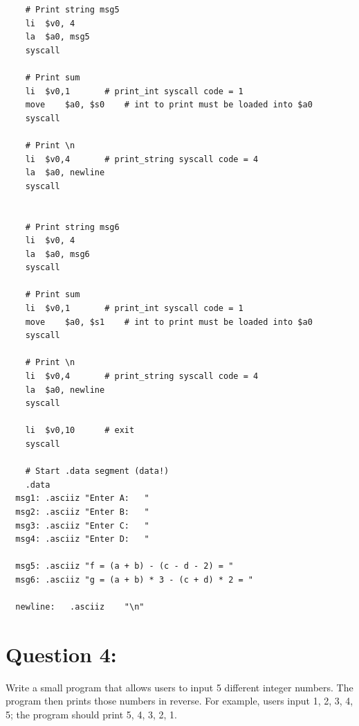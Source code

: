 \documentclass[12pt,a4paper]{article}
\begin{document}
\begin{mdframed}[hidealllines=true,backgroundcolor=magenta!10]
\begin{lstlisting}
    # Print string msg5
    li	$v0, 4
    la	$a0, msg5
    syscall

    # Print sum
    li	$v0,1		# print_int syscall code = 1
    move	$a0, $s0	# int to print must be loaded into $a0
    syscall

    # Print \n
    li	$v0,4		# print_string syscall code = 4
    la	$a0, newline
    syscall


    # Print string msg6
    li	$v0, 4
    la	$a0, msg6
    syscall

    # Print sum
    li	$v0,1		# print_int syscall code = 1
    move	$a0, $s1	# int to print must be loaded into $a0
    syscall

    # Print \n
    li	$v0,4		# print_string syscall code = 4
    la	$a0, newline
    syscall

    li	$v0,10		# exit
    syscall

    # Start .data segment (data!)
    .data
  msg1:	.asciiz	"Enter A:   "
  msg2:	.asciiz	"Enter B:   "
  msg3:	.asciiz	"Enter C:   "
  msg4:	.asciiz	"Enter D:   "

  msg5:	.asciiz	"f = (a + b) - (c - d - 2) = "
  msg6:	.asciiz	"g = (a + b) * 3 - (c + d) * 2 = "

  newline:   .asciiz	"\n"

        \end{lstlisting}
\end{mdframed}


\section*{Question 4:}

Write a small program that allows users to input 5 different integer numbers. The program then prints those numbers in reverse. For example, users input 1, 2, 3, 4, 5; the program should print 5, 4, 3, 2, 1.
\end{document}
